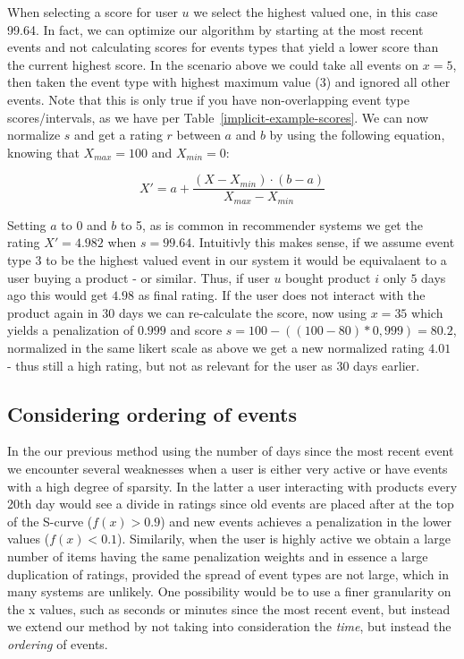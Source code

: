 When selecting a score for user $u$ we select the highest valued one, in this
case 99.64. In fact, we can optimize our algorithm by starting at the most
recent events and not calculating scores for events types that yield a lower
score than the current highest score. In the scenario above we could take all
events on $x=5$, then taken the event type with highest maximum value (3) and
ignored all other events. Note that this is only true if you have
non-overlapping event type scores/intervals, as we have per
Table~\ref{implicit-example-scores}. We can now normalize $s$ and get a rating
$r$ between $a$ and $b$ by using the following equation, knowing that $X_{max}
= 100$ and $X_{min} = 0$:

\begin{equation}
  \label{eq-normalization}
  X' = a + \frac{(X-X_{min})\cdot(b-a)}{X_{max}-X_{min}}
\end{equation}

Setting $a$ to 0 and $b$ to 5, as is common in recommender systems we get the
rating $X' = 4.982$ when $s = 99.64$. Intuitivly this makes sense, if we assume
event type 3 to be the highest valued event in our system it would be
equivalaent to a user buying a product - or similar. Thus, if user $u$ bought
product $i$ only $5$ days ago this would get $4.98$ as final rating. If the
user does not interact with the product again in 30 days we can re-calculate
the score, now using $x=35$ which yields a penalization of $0.999$ and score $s
= 100-((100-80)*0,999) = 80.2$, normalized in the same likert scale as above we
get a new normalized rating $4.01$ - thus still a high rating, but not as
relevant for the user as 30 days earlier.

\subsection{Considering ordering of events}

In the our previous method using the number of days since the most recent event
we encounter several weaknesses when a user is either very active or have
events with a high degree of sparsity. In the latter a user interacting with
products every 20th day would see a divide in ratings since old events are
placed after at the top of the S-curve ($f(x) > 0.9$) and new events achieves a
penalization in the lower values ($f(x) < 0.1$). Similarily, when the user is
highly active we obtain a large number of items having the same penalization
weights and in essence a large duplication of ratings, provided the spread of
event types are not large, which in many systems are unlikely. One possibility
would be to use a finer granularity on the x values, such as seconds or minutes
since the most recent event, but instead we extend our method by not taking
into consideration the \textit{time}, but instead the \textit{ordering} of
events.

